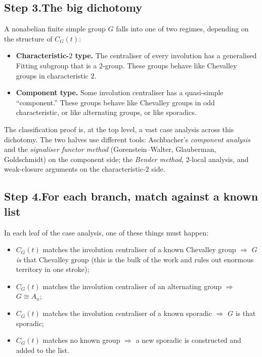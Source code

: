 \documentclass[11pt]{article}
\begin{document}
\subsection*{Step 3.\quad The big dichotomy}

A nonabelian finite simple group $G$ falls into one of two regimes,
depending on the structure of $C_G(t)$:

\begin{itemize}[leftmargin=*, itemsep=2pt]
  \item \textbf{Characteristic-$2$ type.} The centraliser of every
        involution has a generalised Fitting subgroup that is a
        $2$-group. These groups behave like Chevalley groups in
        characteristic $2$.
  \item \textbf{Component type.} Some involution centraliser has a
        quasi-simple ``component.'' These groups behave like Chevalley
        groups in odd characteristic, or like alternating groups, or
        like sporadics.
\end{itemize}

The classification proof is, at the top level, a vast case analysis
across this dichotomy. The two halves use different tools:
Aschbacher's \emph{component analysis} and the \emph{signaliser
functor method} (Gorenstein--Walter, Glauberman, Goldschmidt) on the
component side; the \emph{Bender method}, $2$-local analysis, and
weak-closure arguments on the characteristic-$2$ side.

\subsection*{Step 4.\quad For each branch, match against a known list}

In each leaf of the case analysis, one of these things must happen:

\begin{itemize}[leftmargin=*, itemsep=2pt]
  \item $C_G(t)$ matches the involution centraliser of a known
        Chevalley group $\Rightarrow$ $G$ \emph{is} that Chevalley
        group (this is the bulk of the work and rules out enormous
        territory in one stroke);
  \item $C_G(t)$ matches the involution centraliser of an alternating
        group $\Rightarrow$ $G \cong A_n$;
  \item $C_G(t)$ matches the involution centraliser of a known
        sporadic $\Rightarrow$ $G$ is that sporadic;
  \item $C_G(t)$ matches no known group $\Rightarrow$ a new sporadic
        is constructed and added to the list.
\end{itemize}
\end{document}

